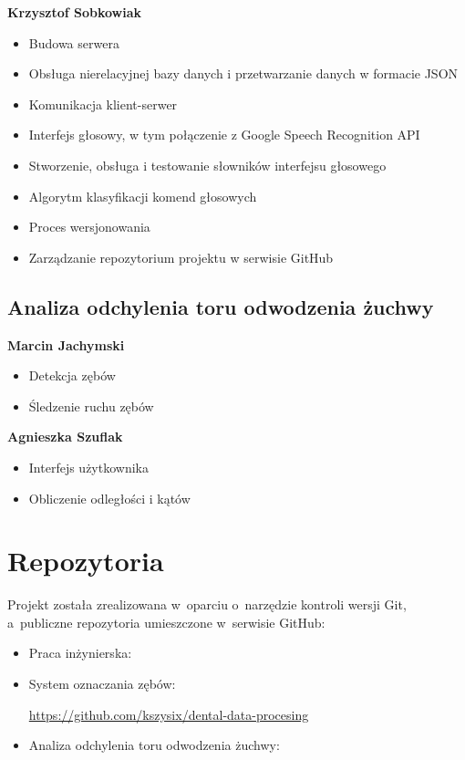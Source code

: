 \textbf{Krzysztof Sobkowiak}    
\begin{itemize}
    \item Budowa serwera
    \item Obsługa nierelacyjnej bazy danych i przetwarzanie danych w formacie JSON
    \item Komunikacja klient-serwer
    \item Interfejs głosowy, w tym połączenie z Google Speech Recognition API
    \item Stworzenie, obsługa i testowanie słowników interfejsu głosowego
    \item Algorytm klasyfikacji komend głosowych
    \item Proces wersjonowania
    \item Zarządzanie repozytorium projektu w serwisie GitHub
\end{itemize}

\subsection{Analiza odchylenia toru odwodzenia żuchwy}
\textbf{Marcin Jachymski}
\begin{itemize}
    \item Detekcja zębów
    \item Śledzenie ruchu zębów
\end{itemize}

\textbf{Agnieszka Szuflak}    
\begin{itemize}
    \item Interfejs użytkownika
    \item Obliczenie odległości i kątów
\end{itemize}

\section{Repozytoria}
Projekt została zrealizowana w~oparciu o~narzędzie kontroli wersji Git, a~publiczne repozytoria umieszczone w~serwisie GitHub:

\begin{itemize}
    \item Praca inżynierska:
    
    \url{}

    \item System oznaczania zębów:
    
    \url{https://github.com/kszysix/dental-data-procesing}
    
    \item Analiza odchylenia toru odwodzenia żuchwy:
    
    \url{}
\end{itemize}

